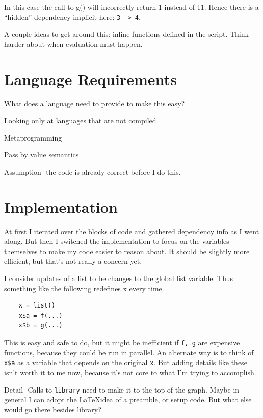 \documentclass[12pt]{article}
\begin{document}
In this case the call to g() will incorrectly return 1 instead of 11.
Hence there is a ``hidden'' dependency implicit here: \texttt{3 -> 4}.

A couple ideas to get around this: inline functions defined in the script.
Think harder about when evaluation must happen.

\section{Language Requirements}

What does a language need to provide to make this easy?

Looking only at languages that are not compiled.

Metaprogramming

Pass by value semantics

Assumption- the code is already correct before I do this.

\section{Implementation}

At first I iterated over the blocks of code and gathered dependency info as
I went along. But then I switched the implementation to focus on the variables
themselves to make my code easier to reason about. It should be slightly
more efficient, but that's not really a concern yet.

I consider updates of a list to be changes to the global list variable.
Thus something like the following redefines x every time. 

\begin{verbatim}
    x = list()
    x$a = f(...)
    x$b = g(...)
\end{verbatim}
 
This is easy and safe to do, but it might be inefficient if \texttt{f, g}
are expensive functions, because they could be run in parallel. An
alternate way is to think of \texttt{x\$a} as a variable that depends on
the original \texttt{x}. But adding details like these isn't worth it to me
now, because it's not core to what I'm trying to accomplish.

Detail- Calls to \texttt{library} need to make it to the top of the graph. Maybe in
general I can adopt the \LaTeX idea of a preamble, or setup code. But what else would go
there besides library?
\end{document}
